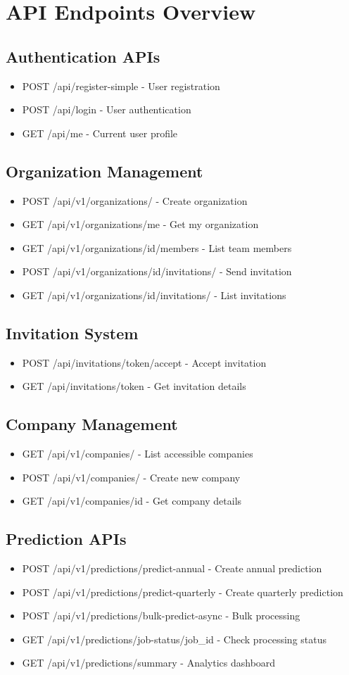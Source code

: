 \documentclass[a4paper,12pt]{article}
\newcommand{\sectionbreak}{\clearpage}
\newcommand{\subitem}[1]{\item[\textbullet] #1}
\begin{document}
\sectionbreak

\section*{API Endpoints Overview}

\subsection*{Authentication APIs}
\begin{itemize}
    \subitem POST /api/register-simple - User registration
    \subitem POST /api/login - User authentication
    \subitem GET /api/me - Current user profile
\end{itemize}

\subsection*{Organization Management}
\begin{itemize}
    \subitem POST /api/v1/organizations/ - Create organization
    \subitem GET /api/v1/organizations/me - Get my organization
    \subitem GET /api/v1/organizations/{id}/members - List team members
    \subitem POST /api/v1/organizations/{id}/invitations/ - Send invitation
    \subitem GET /api/v1/organizations/{id}/invitations/ - List invitations
\end{itemize}

\subsection*{Invitation System}
\begin{itemize}
    \subitem POST /api/invitations/{token}/accept - Accept invitation
    \subitem GET /api/invitations/{token} - Get invitation details
\end{itemize}

\subsection*{Company Management}
\begin{itemize}
    \subitem GET /api/v1/companies/ - List accessible companies
    \subitem POST /api/v1/companies/ - Create new company
    \subitem GET /api/v1/companies/{id} - Get company details
\end{itemize}

\subsection*{Prediction APIs}
\begin{itemize}
    \subitem POST /api/v1/predictions/predict-annual - Create annual prediction
    \subitem POST /api/v1/predictions/predict-quarterly - Create quarterly prediction
    \subitem POST /api/v1/predictions/bulk-predict-async - Bulk processing
    \subitem GET /api/v1/predictions/job-status/{job_id} - Check processing status
    \subitem GET /api/v1/predictions/summary - Analytics dashboard
\end{itemize}
\end{document}
